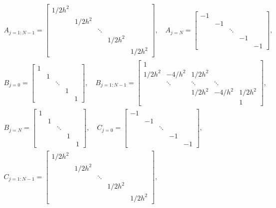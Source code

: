 \documentclass[reqno, 12pt]{amsart}
\begin{document}
    \begin{gather*}
        A_{j = 1:N-1} = \begin{bmatrix} 1/2h^2 \\ & 1/2h^2 \\ & & \ddots \\ & & & 1/2h^2 \\&  & & & 1/2h^2 \end{bmatrix}, \quad
        A_{j = N} = \begin{bmatrix} -1 \\ & -1 \\ & & \ddots \\ && & -1 \\ & & & & -1 \end{bmatrix}, \\
        B_{j = 0} = \begin{bmatrix} 1 \\ & 1 \\ & & \ddots \\ & & & 1 \\ & & & & 1 \end{bmatrix}, \quad
        B_{j = 1:N-1} = \begin{bmatrix} 1 \\ 1/2h^2 & -4/h^2 & 1/2h^2 \\ & \ddots & \ddots & \ddots \\ & & 1/2h^2 & -4/h^2 & 1/2h^2 \\ & & & & 1  \end{bmatrix}, \\
        B_{j = N} = \begin{bmatrix} 1 \\ & 1 \\ & & \ddots \\ & & & 1 \\ & & & & 1 \end{bmatrix}, \quad
        C_{j = 0} = \begin{bmatrix} -1 \\ & -1 \\ && \ddots \\ &&& -1 \\ &&&& -1 \end{bmatrix}, \\
        C_{j = 1:N-1} = \begin{bmatrix} 1/2h^2 \\ & 1/2h^2 \\ & & \ddots \\ & & &  1/2h^2 \\ & & & & 1/2h^2 \end{bmatrix}, \quad
    \end{gather*}
\end{document}
